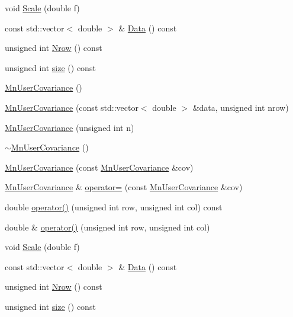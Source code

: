 \begin{DoxyCompactItemize}
void \mbox{\hyperlink{classROOT_1_1Minuit2_1_1MnUserCovariance_ab94f947af8cd0dbff661baa69b429ae3}{Scale}} (double f)
\item 
const std\+::vector$<$ double $>$ \& \mbox{\hyperlink{classROOT_1_1Minuit2_1_1MnUserCovariance_a796819e63a5a1a80373a7be0cd764f2e}{Data}} () const
\item 
unsigned int \mbox{\hyperlink{classROOT_1_1Minuit2_1_1MnUserCovariance_a10adc07ae961afea4de48183aa68f6fc}{Nrow}} () const
\item 
unsigned int \mbox{\hyperlink{classROOT_1_1Minuit2_1_1MnUserCovariance_ab15b9a83170c4e1bda1c22634fe020f5}{size}} () const
\item 
\mbox{\hyperlink{classROOT_1_1Minuit2_1_1MnUserCovariance_a40b83657c20ed7612fd58971145e2150}{Mn\+User\+Covariance}} ()
\item 
\mbox{\hyperlink{classROOT_1_1Minuit2_1_1MnUserCovariance_aeb4bbc60170bc2b4694b9064b4f6761c}{Mn\+User\+Covariance}} (const std\+::vector$<$ double $>$ \&data, unsigned int nrow)
\item 
\mbox{\hyperlink{classROOT_1_1Minuit2_1_1MnUserCovariance_a595fae416d6ebce671a3aac8320ac0e4}{Mn\+User\+Covariance}} (unsigned int n)
\item 
\mbox{\hyperlink{classROOT_1_1Minuit2_1_1MnUserCovariance_ae26c8658a5a5e7fbf16a4fe7e63740ee}{$\sim$\+Mn\+User\+Covariance}} ()
\item 
\mbox{\hyperlink{classROOT_1_1Minuit2_1_1MnUserCovariance_a5f815aae41551b49080ce32c11a5a865}{Mn\+User\+Covariance}} (const \mbox{\hyperlink{classROOT_1_1Minuit2_1_1MnUserCovariance}{Mn\+User\+Covariance}} \&cov)
\item 
\mbox{\hyperlink{classROOT_1_1Minuit2_1_1MnUserCovariance}{Mn\+User\+Covariance}} \& \mbox{\hyperlink{classROOT_1_1Minuit2_1_1MnUserCovariance_a404884fb8452152d56ff18f83e277960}{operator=}} (const \mbox{\hyperlink{classROOT_1_1Minuit2_1_1MnUserCovariance}{Mn\+User\+Covariance}} \&cov)
\item 
double \mbox{\hyperlink{classROOT_1_1Minuit2_1_1MnUserCovariance_abc3ebb8eb0d31cb2cdf38fb16a4d8224}{operator()}} (unsigned int row, unsigned int col) const
\item 
double \& \mbox{\hyperlink{classROOT_1_1Minuit2_1_1MnUserCovariance_af63a82e8fc0c72cdb46fe670da78ffce}{operator()}} (unsigned int row, unsigned int col)
\item 
void \mbox{\hyperlink{classROOT_1_1Minuit2_1_1MnUserCovariance_ab94f947af8cd0dbff661baa69b429ae3}{Scale}} (double f)
\item 
const std\+::vector$<$ double $>$ \& \mbox{\hyperlink{classROOT_1_1Minuit2_1_1MnUserCovariance_a796819e63a5a1a80373a7be0cd764f2e}{Data}} () const
\item 
unsigned int \mbox{\hyperlink{classROOT_1_1Minuit2_1_1MnUserCovariance_a10adc07ae961afea4de48183aa68f6fc}{Nrow}} () const
\item 
unsigned int \mbox{\hyperlink{classROOT_1_1Minuit2_1_1MnUserCovariance_ab15b9a83170c4e1bda1c22634fe020f5}{size}} () const
\end{DoxyCompactItemize}


